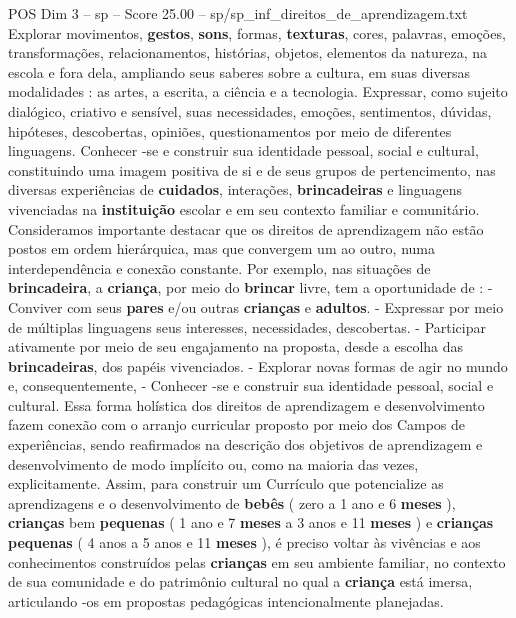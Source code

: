 \begin{textsample}{POS Dim 3 – sp – Score 25.00 – sp/sp\_inf\_direitos\_de\_aprendizagem.txt}
Explorar movimentos, \textbf{gestos}, \textbf{sons}, formas, \textbf{texturas}, cores, palavras, emoções, transformações, relacionamentos, histórias, objetos, elementos da natureza, na escola e fora dela, ampliando seus saberes sobre a cultura, em suas diversas modalidades : as artes, a escrita, a ciência e a tecnologia.
Expressar, como sujeito dialógico, criativo e sensível, suas necessidades, emoções, sentimentos, dúvidas, hipóteses, descobertas, opiniões, questionamentos por meio de diferentes linguagens.
Conhecer -se e construir sua identidade pessoal, social e cultural, constituindo uma imagem positiva de si e de seus grupos de pertencimento, nas diversas experiências de \textbf{cuidados}, interações, \textbf{brincadeiras} e linguagens vivenciadas na \textbf{instituição} escolar e em seu contexto familiar e comunitário.
Consideramos importante destacar que os direitos de aprendizagem não estão postos em ordem hierárquica, mas que convergem um ao outro, numa interdependência e conexão constante.
Por exemplo, nas situações de \textbf{brincadeira}, a \textbf{criança}, por meio do \textbf{brincar} livre, tem a oportunidade de : - Conviver com seus \textbf{pares} e/ou outras \textbf{crianças} e \textbf{adultos}. - Expressar por meio de múltiplas linguagens seus interesses, necessidades, descobertas. - Participar ativamente por meio de seu engajamento na proposta, desde a escolha das \textbf{brincadeiras}, dos papéis vivenciados. - Explorar novas formas de agir no mundo e, consequentemente, - Conhecer -se e construir sua identidade pessoal, social e cultural.
Essa forma holística dos direitos de aprendizagem e desenvolvimento fazem conexão com o arranjo curricular proposto por meio dos Campos de experiências, sendo reafirmados na descrição dos objetivos de aprendizagem e desenvolvimento de modo implícito ou, como na maioria das vezes, explicitamente.
Assim, para construir um Currículo que potencialize as aprendizagens e o desenvolvimento de \textbf{bebês} ( zero a 1 ano e 6 \textbf{meses} ), \textbf{crianças} bem \textbf{pequenas} ( 1 ano e 7 \textbf{meses} a 3 anos e 11 \textbf{meses} ) e \textbf{crianças} \textbf{pequenas} ( 4 anos a 5 anos e 11 \textbf{meses} ), é preciso voltar às vivências e aos conhecimentos construídos pelas \textbf{crianças} em seu ambiente familiar, no contexto de sua comunidade e do patrimônio cultural no qual a \textbf{criança} está imersa, articulando -os em propostas pedagógicas intencionalmente planejadas.

\end{textsample}
